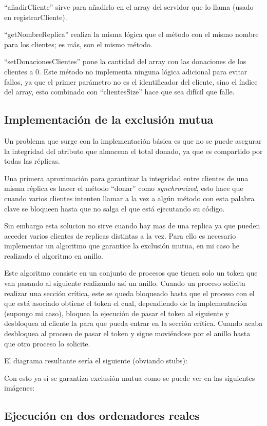 \documentclass{article}
\begin{document}
``añadirCliente'' sirve para añadirlo en el array del servidor que lo llama (usado en registrarCliente).

``getNombreReplica'' realiza la misma lógica que el método con el mismo nombre para los clientes; es más, son el mismo método.

``setDonacionesClientes'' pone la cantidad del array con las donaciones de los clientes a 0. Este método no implementa ninguna lógica adicional para evitar fallos, ya que el primer parámetro no es el identificador del cliente, sino el índice del array, esto combinado con ``clientesSize'' hace que sea difícil que falle.

\subsection{Implementación de la exclusión mutua}
Un problema que surge con la implementación básica es que no se puede asegurar la integridad del atributo que almacena el total donado, ya que es compartido por todas las réplicas. 


Una primera aproximación para garantizar la integridad entre clientes de una misma réplica es hacer el método ``donar'' como \textit{synchronized}, esto hace que cuando varios clientes intenten llamar a la vez a algún método con esta palabra clave se bloqueen hasta que no salga el que está ejecutando su código.

Sin embargo esta solucion no sirve cuando hay mas de una replica ya que pueden acceder varios clientes de replicas distintas a la vez. Para ello es necesario implementar un algoritmo que garantice la exclusión mutua, en mi caso he realizado el algoritmo en anillo.

Este algoritmo consiste en un conjunto de procesos que tienen solo un token que van pasando al siguiente realizando así un anillo. Cuando un proceso solicita realizar una sección crítica, este se queda bloqueado hasta que el proceso con el que está asociado obtiene el token el cual, dependiendo de la implementación (supongo mi caso), bloquea la ejecución de pasar el token al siguiente y desbloquea al cliente la para que pueda entrar en la sección crítica. Cuando acaba desbloquea al proceso de pasar el token y sigue moviéndose por el anillo hasta que otro proceso lo solicite.

El diagrama resultante sería el siguiente (obviando stubs):


Con esto ya sí se garantiza exclusión mutua como se puede ver en las siguientes imágenes:




\subsection{Ejecución en dos ordenadores reales}
\end{document}
